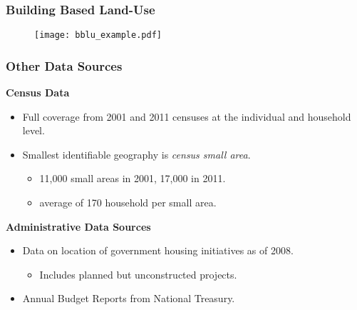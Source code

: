 \documentclass[aspectratio=149]{beamer}
\begin{document}
\begin{frame}
\frametitle{Building Based Land-Use}

\begin{figure}
 \texttt{[image: bblu\_example.pdf]} 
\end{figure}
\end{frame}


\begin{frame}
\frametitle{Other Data Sources}



 {\bf Census Data} 



  \begin{itemize}
    \item Full coverage from 2001 and 2011 censuses at the individual and household level.

    \item Smallest identifiable geography is {\it census small area}.
    \begin{itemize}
    \item 11,000 small areas in 2001, 17,000 in 2011.
    \item average of 170 household per small area.
    \end{itemize}
  \end{itemize}

  \vspace{2mm}

  {\bf Administrative Data Sources} 



  \begin{itemize}
    \item Data on location of government housing initiatives as of 2008.
    \begin{itemize} 
      \item Includes planned but unconstructed projects.
    \end{itemize}

    \item Annual Budget Reports from National Treasury. 
    
  \end{itemize}

\end{frame}

\end{document}

